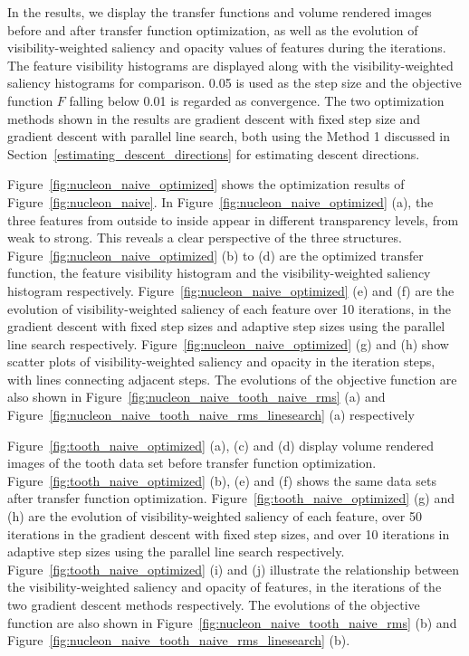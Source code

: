 In the results, we display the transfer functions and volume rendered images before and after transfer function optimization, as well as the evolution of visibility-weighted saliency and opacity values of features during the iterations.
The feature visibility histograms \cite{wang_efficient_2011} are displayed along with the visibility-weighted saliency histograms for comparison.
0.05 is used as the step size and the objective function $ F $ falling below 0.01 is regarded as convergence.
The two optimization methods shown in the results are gradient descent with fixed step size and gradient descent with parallel line search, both using the Method 1 discussed in Section~\ref{estimating_descent_directions} for estimating descent directions.

Figure~\ref{fig:nucleon_naive_optimized} shows the optimization results of Figure~\ref{fig:nucleon_naive}. In Figure~\ref{fig:nucleon_naive_optimized} (a), the three features from outside to inside appear in different transparency levels, from weak to strong. This reveals a clear perspective of the three structures.
Figure~\ref{fig:nucleon_naive_optimized} (b) to (d) are the optimized transfer function, the feature visibility histogram and the visibility-weighted saliency histogram respectively.
Figure~\ref{fig:nucleon_naive_optimized} (e) and (f) are the evolution of visibility-weighted saliency of each feature over 10 iterations, in the gradient descent with fixed step sizes and adaptive step sizes using the parallel line search respectively. Figure~\ref{fig:nucleon_naive_optimized} (g) and (h) show scatter plots of visibility-weighted saliency and opacity in the iteration steps, with lines connecting adjacent steps.
The evolutions of the objective function are also shown in Figure~\ref{fig:nucleon_naive_tooth_naive_rms} (a) and Figure~\ref{fig:nucleon_naive_tooth_naive_rms_linesearch} (a) respectively

Figure~\ref{fig:tooth_naive_optimized} (a), (c) and (d) display volume rendered images of the tooth data set before transfer function optimization. Figure~\ref{fig:tooth_naive_optimized} (b), (e) and (f) shows the same data sets after transfer function optimization.
Figure~\ref{fig:tooth_naive_optimized} (g) and (h) are the evolution of visibility-weighted saliency of each feature, over 50 iterations in the gradient descent with fixed step sizes, and over 10 iterations in adaptive step sizes using the parallel line search respectively. Figure~\ref{fig:tooth_naive_optimized} (i) and (j) illustrate the relationship between the visibility-weighted saliency and opacity of features, in the iterations of the two gradient descent methods respectively.
The evolutions of the objective function are also shown in Figure~\ref{fig:nucleon_naive_tooth_naive_rms} (b) and Figure~\ref{fig:nucleon_naive_tooth_naive_rms_linesearch} (b).

